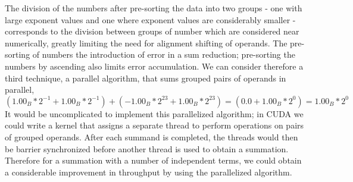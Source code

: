\documentclass[7pt]{article}
\begin{document}
The division of the numbers after pre-sorting the data into two groups - one with large exponent values and one where exponent values are considerably smaller - corresponds to the division between groups of number which are considered near numerically, greatly limiting the need for alignment shifting of operands. The pre-sorting of numbers the introduction of error in a sum reduction; pre-sorting the numbers by ascending also limits error accumulation.  We can consider therefore a third technique, a parallel algorithm, that sums grouped pairs of operands in parallel,
\begin{equation*}
(1.00_B*2^{-1} + 1.00_B*2^{-1}) +  (-1.00_B*2^{23} + 1.00_B*2^{23})  = (0.0 + 1.00_B*2^{0}) = 1.00_B*2^{0}   
\end{equation*} 
It would be uncomplicated to implement this parallelized algorithm; in CUDA we could write a kernel that assigns a separate thread to perform operations on pairs of grouped operands. After each summand is completed, the threads would then be barrier synchronized before another thread is used to obtain a summation. Therefore for a summation with a number of independent terms, we could obtain a considerable improvement in throughput by using the parallelized algorithm.
\end{document}
